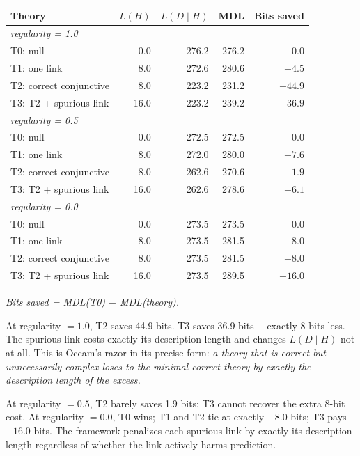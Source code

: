 \begin{center}
\begin{tabular}{lrrrr}
\toprule
Theory & $L(H)$ & $L(D \mid H)$ & MDL & Bits saved \\
\midrule
\multicolumn{5}{l}{\textit{regularity = 1.0}} \\
T0: null                &  0.0 & 276.2 & 276.2 &       $0.0$ \\
T1: one link            &  8.0 & 272.6 & 280.6 &      $-4.5$ \\
T2: correct conjunctive &  8.0 & 223.2 & 231.2 & $+\mathbf{44.9}$ \\
T3: T2 + spurious link  & 16.0 & 223.2 & 239.2 &     $+36.9$ \\
\midrule
\multicolumn{5}{l}{\textit{regularity = 0.5}} \\
T0: null                &  0.0 & 272.5 & 272.5 & $\mathbf{0.0}$ \\
T1: one link            &  8.0 & 272.0 & 280.0 &      $-7.6$ \\
T2: correct conjunctive &  8.0 & 262.6 & 270.6 &      $+1.9$ \\
T3: T2 + spurious link  & 16.0 & 262.6 & 278.6 &      $-6.1$ \\
\midrule
\multicolumn{5}{l}{\textit{regularity = 0.0}} \\
T0: null                &  0.0 & 273.5 & 273.5 & $\mathbf{0.0}$ \\
T1: one link            &  8.0 & 273.5 & 281.5 &      $-8.0$ \\
T2: correct conjunctive &  8.0 & 273.5 & 281.5 &      $-8.0$ \\
T3: T2 + spurious link  & 16.0 & 273.5 & 289.5 &     $-16.0$ \\
\bottomrule
\end{tabular}
\end{center}

\textit{Bits saved = MDL(T0) $-$ MDL(theory).}

At regularity $= 1.0$, T2 saves 44.9 bits. T3 saves 36.9 bits---
exactly 8 bits less. The spurious link costs exactly its description
length and changes $L(D \mid H)$ not at all. This is Occam's razor in
its precise form: \emph{a theory that is correct but unnecessarily
complex loses to the minimal correct theory by exactly the description
length of the excess.}

At regularity $= 0.5$, T2 barely saves 1.9 bits; T3 cannot recover
the extra 8-bit cost. At regularity $= 0.0$, T0 wins; T1 and T2 tie
at exactly $-8.0$ bits; T3 pays $-16.0$ bits. The framework penalizes
each spurious link by exactly its description length regardless of
whether the link actively harms prediction.

